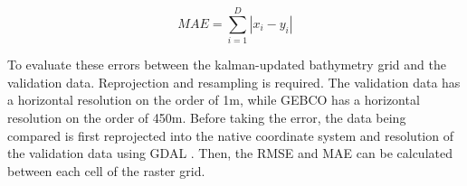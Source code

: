 $$ MAE = \sum_{i=1}^{D}|x_i-y_i| $$

To evaluate these errors between the kalman-updated bathymetry grid and the validation data. Reprojection and resampling is required. The validation data has a horizontal resolution on the order of 1m, while GEBCO has a horizontal resolution on the order of 450m. Before taking the error, the data being compared is first reprojected into the native coordinate system and resolution of the validation data using GDAL \parencite{rouault_even_2022_6352176}. Then, the RMSE and MAE can be calculated between each cell of the raster grid.


